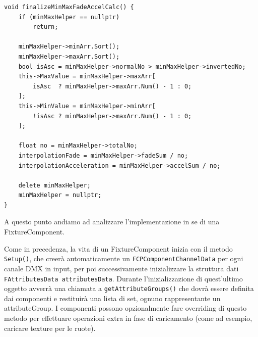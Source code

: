 \documentclass[main.tex]{subfiles}
\begin{document}
\begin{lstlisting}
void finalizeMinMaxFadeAccelCalc() {
    if (minMaxHelper == nullptr)
        return;
    
    minMaxHelper->minArr.Sort();
    minMaxHelper->maxArr.Sort();
    bool isAsc = minMaxHelper->normalNo > minMaxHelper->invertedNo;
    this->MaxValue = minMaxHelper->maxArr[
        isAsc  ? minMaxHelper->maxArr.Num() - 1 : 0;
    ];
    this->MinValue = minMaxHelper->minArr[
        !isAsc ? minMaxHelper->maxArr.Num() - 1 : 0;
    ];

    float no = minMaxHelper->totalNo;
    interpolationFade = minMaxHelper->fadeSum / no;
    interpolationAcceleration = minMaxHelper->accelSum / no;

    delete minMaxHelper;
    minMaxHelper = nullptr;
}
\end{lstlisting}

A questo punto andiamo ad analizzare l'implementazione in se di una FixtureComponent.\newline

Come in precedenza, la vita di un FixtureComponent inizia con il metodo \lstinline{Setup()}, che creerà automaticamente un \lstinline{FCPComponentChannelData} per ogni canale DMX in input, per poi successivamente inizializzare la struttura dati \lstinline{FAttributesData attributesData}. Durante l'inizializzazione di quest'ultimo oggetto avverrà una chiamata a \lstinline{getAttributeGroups()} che dovrà essere definita dai componenti e restituirà una lista di set, ognuno rappresentante un attributeGroup. I componenti possono opzionalmente fare overriding di questo metodo per effettuare operazioni extra in fase di caricamento (come ad esempio, caricare texture per le ruote).
\end{document}
